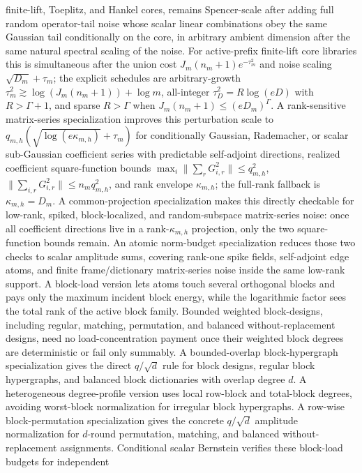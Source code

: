 \documentclass[11pt]{article}
\begin{document}
finite-lift, Toeplitz, and Hankel cores, remains Spencer-scale after adding
full random operator-tail noise whose scalar linear combinations obey the same
Gaussian tail conditionally on the core, in arbitrary ambient dimension after
the same natural spectral scaling of the noise.  For active-prefix finite-lift
core libraries this is simultaneous after the union cost
\(J_m(n_m+1)e^{-\tau_m^2}\) and noise scaling \(\sqrt{D_m}+\tau_m\);
the explicit schedules are arbitrary-growth
\(\tau_m^2\gtrsim\log(J_m(n_m+1))+\log m\), all-integer
\(\tau_D^2=R\log(eD)\) with \(R>\Gamma+1\), and sparse \(R>\Gamma\)
when \(J_m(n_m+1)\le(eD_m)^\Gamma\).
A rank-sensitive matrix-series specialization improves this perturbation scale
to \(q_{m,h}(\sqrt{\log(e\kappa_{m,h})}+\tau_m)\) for conditionally Gaussian,
Rademacher, or scalar sub-Gaussian coefficient series with predictable
self-adjoint directions, realized coefficient square-function bounds
\(\max_i\|\sum_rG_{i,r}^2\|\le q_{m,h}^2\),
\(\|\sum_{i,r}G_{i,r}^2\|\le n_mq_{m,h}^2\), and rank envelope
\(\kappa_{m,h}\); the full-rank fallback is \(\kappa_{m,h}=D_m\).
A common-projection specialization makes this directly checkable for low-rank,
spiked, block-localized, and random-subspace matrix-series noise: once all
coefficient directions live in a rank-\(\kappa_{m,h}\) projection, only the two
square-function bounds remain.
An atomic norm-budget specialization reduces those two checks to scalar
amplitude sums, covering rank-one spike fields, self-adjoint edge atoms, and
finite frame/dictionary matrix-series noise inside the same low-rank support.
A block-load version lets atoms touch several orthogonal blocks and pays only
the maximum incident block energy, while the logarithmic factor sees the total
rank of the active block family.
Bounded weighted block-designs, including regular, matching, permutation, and
balanced without-replacement designs, need no load-concentration payment once
their weighted block degrees are deterministic or fail only summably.
A bounded-overlap block-hypergraph specialization gives the direct
\(q/\sqrt d\) rule for block designs, regular block hypergraphs, and balanced
block dictionaries with overlap degree \(d\).
A heterogeneous degree-profile version uses local row-block and total-block
degrees, avoiding worst-block normalization for irregular block hypergraphs.
A row-wise block-permutation specialization gives the concrete \(q/\sqrt d\)
amplitude normalization for \(d\)-round permutation, matching, and balanced
without-replacement assignments.
Conditional scalar Bernstein verifies these block-load budgets for independent
\end{document}

